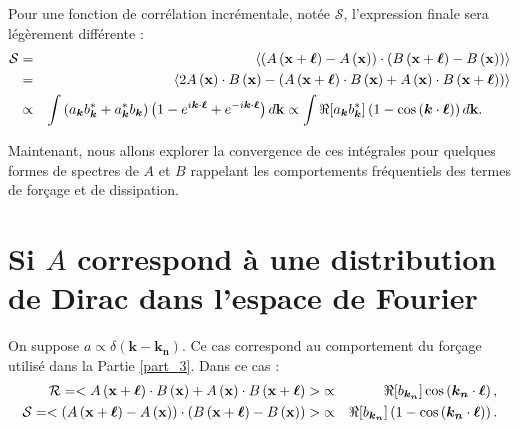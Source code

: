  Pour une fonction de corrélation incrémentale, notée $\mathcal{S}$, l'expression finale sera légèrement différente :
 \begin{eqnarray}
 \mathcal{S} &=& \left<\left(A\left({\bf x} + \boldsymbol{\ell}\right) - A\left({\bf x}\right)\right)\cdot\left(B\left({\bf x} + \boldsymbol{\ell}\right) - B\left({\bf x}\right)\right) \right> \\
 &=& \left<2A\left({\bf x}\right)\cdot B\left({\bf x}\right) -  \left(A\left({\bf x} + \boldsymbol{\ell}\right)  \cdot B\left({\bf x}\right) + A\left({\bf x}\right)  \cdot B\left({\bf x} + \boldsymbol{\ell}\right)\right) \right>\\
 &\propto& \int \left(a_{\boldsymbol{k}}  b^*_{\boldsymbol{k}} + a^*_{\boldsymbol{k}}  b_{\boldsymbol{k}}\right) \left(1 - e^{i\boldsymbol{k}\cdot\boldsymbol{\ell}} + e^{-i\boldsymbol{k}\cdot\boldsymbol{\ell}}\right)  d{\bf k} \propto \int \Re[a_{\boldsymbol{k}}  b^*_{\boldsymbol{k}}] \left(1-\cos\left(\boldsymbol{k}\cdot\boldsymbol{\ell}\right)\right) d{\bf k} .\qquad
 \end{eqnarray}
 
 Maintenant, nous allons explorer la convergence de ces intégrales pour quelques formes de spectres de $A$ et $B$ rappelant les comportements fréquentiels des termes de forçage et de dissipation.  
 
 \section{Si $A$ correspond à une distribution de Dirac dans l'espace de Fourier} \label{an:forc} 
 
 On suppose $a \propto \delta\left(\boldsymbol{k} - \boldsymbol{k_n}\right)$. Ce cas correspond au comportement du forçage utilisé dans la Partie \ref{part_3}. Dans ce cas :
 \begin{eqnarray}
 \mathcal{R} = <A\left({\bf x} + \boldsymbol{\ell}\right)  \cdot B\left({\bf x}\right) + A\left({\bf x}\right)  \cdot B\left({\bf x} + \boldsymbol{\ell}\right)> 
 &\propto& \Re[b_{\boldsymbol{k_n}}] \cos\left(\boldsymbol{k_n}\cdot\boldsymbol{\ell}\right), \\
 \mathcal{S} = <\left(A\left({\bf x} + \boldsymbol{\ell}\right) - A\left({\bf x}\right)\right)\cdot\left(B\left({\bf x} + \boldsymbol{\ell}\right) - B\left({\bf x}\right)\right) > 
 &\propto&\Re[b_{\boldsymbol{k_n}}] \left(1-\cos\left(\boldsymbol{k_n}\cdot\boldsymbol{\ell}\right)\right) .\nonumber \\
 \end{eqnarray}

